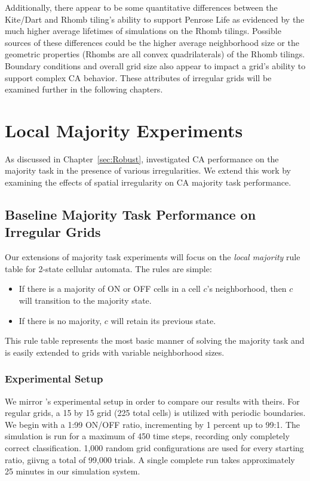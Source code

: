 \documentclass[a4paper,11pt]{report}
\begin{document}
Additionally, there appear to be some quantitative differences between the Kite/Dart and Rhomb tiling's ability to support Penrose Life as evidenced by the much higher average lifetimes of simulations on the Rhomb tilings. Possible sources of these differences could be the higher average neighborhood size or the geometric properties (Rhombs are all convex quadrilaterals) of the Rhomb tilings. Boundary conditions and overall grid size also appear to impact a grid's ability to support complex CA behavior. These attributes of irregular grids will be examined further in the following chapters.

\processdelayedfloats


\chapter{Local Majority Experiments}
\label{ch:local_maj}

As discussed in Chapter~\ref{sec:Robust}, \citeauthor{me07} investigated CA performance on the majority task in the presence of various irregularities. We extend this work by examining the effects of spatial irregularity on CA majority task performance.

\section{Baseline Majority Task Performance on Irregular Grids}

Our extensions of majority task experiments will focus on the \textit{local majority} rule table for 2-state cellular automata. The rules are simple:

\begin{itemize}
\item If there is a majority of ON or OFF cells in a cell $c$'s neighborhood, then $c$ will transition to the majority state.
\item If there is no majority, $c$ will retain its previous state.
\end{itemize}

This rule table represents the most basic manner of solving the majority task and is easily extended to grids with variable neighborhood sizes.

\subsection*{Experimental Setup}
We mirror \citeauthor{me07}'s experimental setup in order to compare our results with theirs. For regular grids, a 15 by 15 grid (225 total cells) is utilized with periodic boundaries. We begin with a 1:99 ON/OFF ratio, incrementing by 1 percent up to 99:1. The simulation is run for a maximum of 450 time steps, recording only completely correct classification. 1,000 random grid configurations are used for every starting ratio, giivng a total of 99,000 trials. A single complete run takes approximately 25 minutes in our simulation system.
\end{document}
